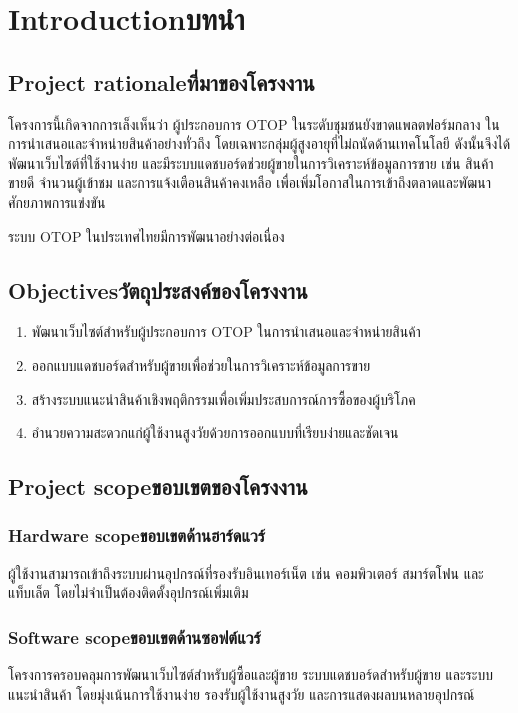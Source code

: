 \chapter{\ifenglish Introduction\else บทนำ\fi}

\section{\ifenglish Project rationale\else ที่มาของโครงงาน\fi}
โครงการนี้เกิดจากการเล็งเห็นว่า ผู้ประกอบการ OTOP ในระดับชุมชนยังขาดแพลตฟอร์มกลาง 
ในการนำเสนอและจำหน่ายสินค้าอย่างทั่วถึง โดยเฉพาะกลุ่มผู้สูงอายุที่ไม่ถนัดด้านเทคโนโลยี  
ดังนั้นจึงได้พัฒนาเว็บไซต์ที่ใช้งานง่าย และมีระบบแดชบอร์ดช่วยผู้ขายในการวิเคราะห์ข้อมูลการขาย 
เช่น สินค้าขายดี จำนวนผู้เข้าชม และการแจ้งเตือนสินค้าคงเหลือ  
เพื่อเพิ่มโอกาสในการเข้าถึงตลาดและพัฒนาศักยภาพการแข่งขัน

ระบบ OTOP ในประเทศไทยมีการพัฒนาอย่างต่อเนื่อง \cite{otop2020}

\section{\ifenglish Objectives\else วัตถุประสงค์ของโครงงาน\fi}
\begin{enumerate}
    \item พัฒนาเว็บไซต์สำหรับผู้ประกอบการ OTOP ในการนำเสนอและจำหน่ายสินค้า
    \item ออกแบบแดชบอร์ดสำหรับผู้ขายเพื่อช่วยในการวิเคราะห์ข้อมูลการขาย
    \item สร้างระบบแนะนำสินค้าเชิงพฤติกรรมเพื่อเพิ่มประสบการณ์การซื้อของผู้บริโภค
    \item อำนวยความสะดวกแก่ผู้ใช้งานสูงวัยด้วยการออกแบบที่เรียบง่ายและชัดเจน
\end{enumerate}

\section{\ifenglish Project scope\else ขอบเขตของโครงงาน\fi}

\subsection{\ifenglish Hardware scope\else ขอบเขตด้านฮาร์ดแวร์\fi}
ผู้ใช้งานสามารถเข้าถึงระบบผ่านอุปกรณ์ที่รองรับอินเทอร์เน็ต เช่น คอมพิวเตอร์ สมาร์ตโฟน 
และแท็บเล็ต โดยไม่จำเป็นต้องติดตั้งอุปกรณ์เพิ่มเติม

\subsection{\ifenglish Software scope\else ขอบเขตด้านซอฟต์แวร์\fi}
โครงการครอบคลุมการพัฒนาเว็บไซต์สำหรับผู้ซื้อและผู้ขาย ระบบแดชบอร์ดสำหรับผู้ขาย 
และระบบแนะนำสินค้า โดยมุ่งเน้นการใช้งานง่าย รองรับผู้ใช้งานสูงวัย และการแสดงผลบนหลายอุปกรณ์


